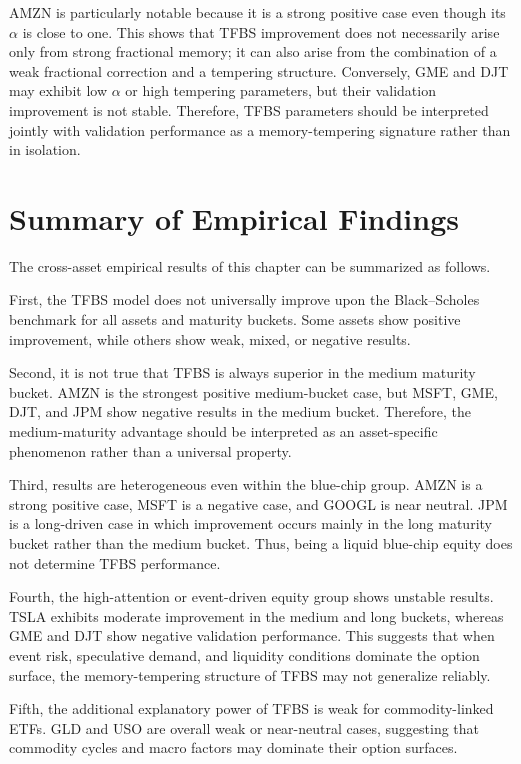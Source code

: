 \documentclass[11pt,a4paper]{report}
\begin{document}
AMZN is particularly notable because it is a strong positive case even though its $\alpha$ is close to one. This shows that TFBS improvement does not necessarily arise only from strong fractional memory; it can also arise from the combination of a weak fractional correction and a tempering structure. Conversely, GME and DJT may exhibit low $\alpha$ or high tempering parameters, but their validation improvement is not stable. Therefore, TFBS parameters should be interpreted jointly with validation performance as a memory-tempering signature rather than in isolation.

\section{Summary of Empirical Findings}

The cross-asset empirical results of this chapter can be summarized as follows.

First, the TFBS model does not universally improve upon the Black--Scholes benchmark for all assets and maturity buckets. Some assets show positive improvement, while others show weak, mixed, or negative results.

Second, it is not true that TFBS is always superior in the medium maturity bucket. AMZN is the strongest positive medium-bucket case, but MSFT, GME, DJT, and JPM show negative results in the medium bucket. Therefore, the medium-maturity advantage should be interpreted as an asset-specific phenomenon rather than a universal property.

Third, results are heterogeneous even within the blue-chip group. AMZN is a strong positive case, MSFT is a negative case, and GOOGL is near neutral. JPM is a long-driven case in which improvement occurs mainly in the long maturity bucket rather than the medium bucket. Thus, being a liquid blue-chip equity does not determine TFBS performance.

Fourth, the high-attention or event-driven equity group shows unstable results. TSLA exhibits moderate improvement in the medium and long buckets, whereas GME and DJT show negative validation performance. This suggests that when event risk, speculative demand, and liquidity conditions dominate the option surface, the memory-tempering structure of TFBS may not generalize reliably.

Fifth, the additional explanatory power of TFBS is weak for commodity-linked ETFs. GLD and USO are overall weak or near-neutral cases, suggesting that commodity cycles and macro factors may dominate their option surfaces.
\end{document}

